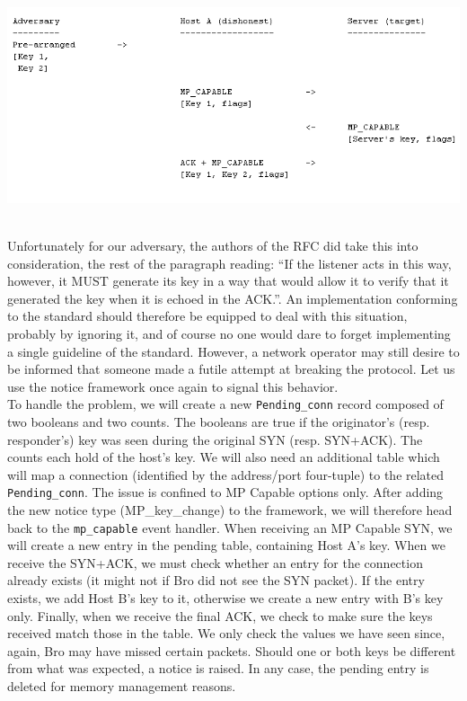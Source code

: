\begin{minipage}[c]{\textwidth}
\centering
\includegraphics[scale = 0.6]{Figures/mpcapattack.png}
\label{pic:2 cap attack}
\end{minipage} \\ 
%

Unfortunately for our adversary, the authors of the RFC did take this into consideration, the rest of the paragraph reading: ``If the listener acts in this way, however, it MUST generate its key in a way that would allow it to verify that it generated the key when it is echoed in the ACK.''. An implementation conforming to the standard should therefore be equipped to deal with this situation, probably by ignoring it, and of course no one would dare to forget implementing a single guideline of the standard. However, a network operator may still desire to be informed that someone made a futile attempt at breaking the protocol. Let us use the notice framework once again to signal this behavior.\\

To handle the problem, we will create a new \texttt{Pending\_conn} record composed of two booleans and two counts. The booleans are true if the originator's (resp. responder's) key was seen during the original SYN (resp. SYN+ACK). The counts each hold of the host's key. We will also need an additional table which will map a connection (identified by the address/port four-tuple) to the related \texttt{Pending\_conn}. The issue is confined to MP Capable options only. After adding the new notice type (MP\_key\_change) to the framework, we will therefore head back to the \texttt{mp\_capable} event handler. When receiving an MP Capable SYN, we will create a new entry in the pending table, containing Host A's key. When we receive the SYN+ACK, we must check whether an entry for the connection already exists (it might not if Bro did not see the SYN packet). If the entry exists, we add Host B's key to it, otherwise we create a new entry with B's key only. Finally, when we receive the final ACK, we check to make sure the keys received match those in the table. We only check the values we have seen since, again, Bro may have missed certain packets. Should one or both keys be different from what was expected, a notice is raised. In any case, the pending entry is deleted for memory management reasons. \\

